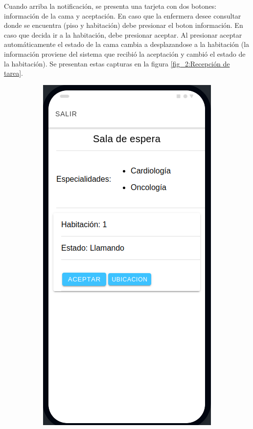 Cuando arriba la notificación, se presenta una tarjeta con dos botones: información de la cama y aceptación. En caso que la enfermera desee consultar donde se encuentra (piso y habitación) debe presionar el boton información. En caso que decida ir a la habitación, debe presionar aceptar.
Al presionar aceptar automáticamente el estado de la cama cambia a desplazandose a la habitación (la información proviene del sistema que recibió la aceptación y cambió el estado de la habitación). Se presentan estas capturas en la figura \ref{fig_2:Recepción de tarea}.

\begin{figure}[!htpb]
     \centering
     \begin{subfigure}[b]{0.3\textwidth}
         \centering
         \includegraphics[width=.95\textwidth]{./Figures/app/enfermera-peticion.png}

\end{subfigure}
\end{figure}
